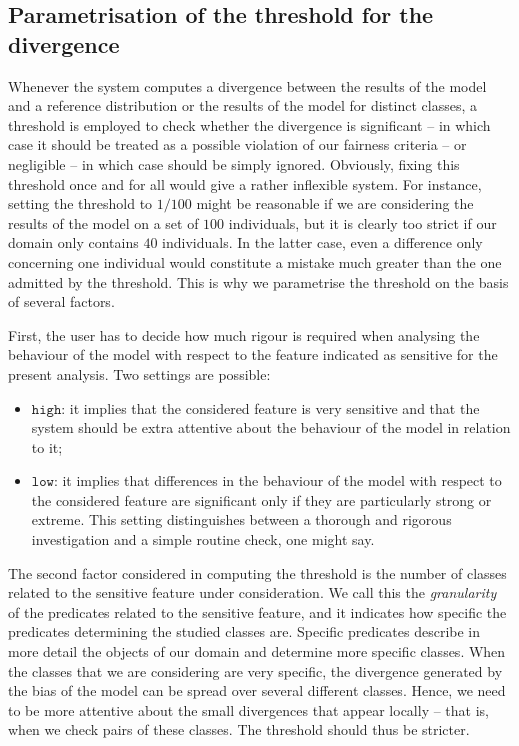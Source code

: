 \documentclass[
]{ceurart}
\begin{document}
\subsection{Parametrisation of the threshold for the divergence}

Whenever the system computes a divergence between the results of the model and a reference distribution or the results of the model for distinct classes, a threshold is employed to check whether the divergence is significant -- in which case it should be treated as a possible violation of our fairness criteria -- or negligible -- in which case should be simply ignored. Obviously, fixing this threshold once and for all would give a rather inflexible system. For instance, setting the threshold to $1/100$ might be reasonable if we are considering the results of the model on a set of $100$ individuals, but it is clearly too strict if our domain only contains $40$ individuals. In the latter case, even a difference only concerning one individual would constitute a mistake much greater than the one admitted by the threshold. This is why we parametrise the threshold on the basis of several factors. 

First, the user has to decide how much rigour is required when analysing the behaviour of the model with respect to the feature indicated as sensitive for the present analysis. Two settings are possible: 

\begin{itemize}
\item $\mathtt{high}$: it implies that the considered feature is very sensitive and that the system should be extra attentive about the behaviour of the model in relation to it;
\item $\mathtt{low}$: it implies that differences in the behaviour of the model with respect to the considered feature are significant only if they are particularly strong or extreme. This setting distinguishes between a thorough and rigorous investigation and a simple routine check, one might say.
\end{itemize}



The second factor considered in computing the threshold is the number of classes related to the sensitive feature under consideration. We  call this the {\it granularity} of the predicates related to the sensitive feature, and it indicates how specific the predicates determining the studied classes are. Specific predicates describe in more detail the objects of our domain and determine more specific classes. When the classes that we are considering are very specific, the divergence generated by the bias of the model can be spread over several different classes. Hence, we need to be more attentive about the small divergences that appear locally -- that is, when we check pairs of these classes. The threshold should thus be stricter.
\end{document}
